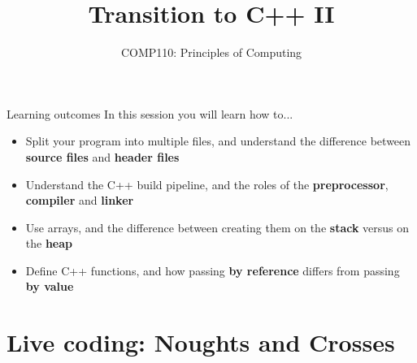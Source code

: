 \documentclass[xcolor={dvipsnames}]{beamer}\usepackage{etoolbox}\newtoggle{printable}\togglefalse{printable}
\begin{document}
\title{Transition to C++ II}   
\subtitle{COMP110: Principles of Computing}

\frame{\titlepage} 

\begin{frame}{Learning outcomes}
	In this session you will learn how to...
	\begin{itemize}
		\item Split your program into multiple files, and understand the difference between
		    \textbf{source files} and \textbf{header files}
		\item Understand the C++ build pipeline, and the roles of the \textbf{preprocessor},
		    \textbf{compiler} and \textbf{linker}
		\item Use arrays, and the difference between creating them on the \textbf{stack}
		    versus on the \textbf{heap}
		\item Define C++ functions, and how passing \textbf{by reference} differs from passing \textbf{by value}
	\end{itemize}
\end{frame}






\part{Live coding: Noughts and Crosses}
\frame{\partpage}


%
\end{document}
